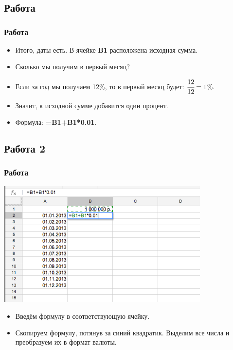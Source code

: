 \documentclass[compress,red]{beamer}
\begin{document}
\subsection{Работа}
\begin{frame}[fragile]
  \frametitle{Работа}
  \begin{itemize}
    \item Итого, даты есть. В ячейке \textbf{B1} расположена исходная сумма.
    \item Сколько мы получим в первый месяц?
    \item Если за год мы получаем 12\%, то в первый месяц будет: $\cfrac{12}{12} = 1$\%.
    \item Значит, к исходной сумме добавится один процент.
    \item Формула: \textbf{=B1+B1*0.01}.
  \end{itemize}
\end{frame}

\subsection{Работа 2}
\begin{frame}[fragile]
  \frametitle{Работа}
  \centerline{\includegraphics[width=0.8\textwidth]{images/16.png}}
  \begin{itemize}
    \item Введём формулу в соответствующую ячейку.
    \item Скопируем формулу, потянув за синий квадратик. Выделим все числа и преобразуем их в формат валюты.
  \end{itemize}
\end{frame}
\end{document}
